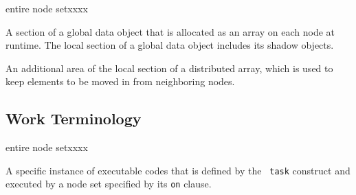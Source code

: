 \begin{namelist}{entire node setxxxx}

 A section of a global data object that is allocated as an array on each node
 at runtime.
%
 The local section of a global data object includes its shadow objects.


 An additional area of the local section of a distributed array, which
 is used to keep elements to be moved in from neighboring
 nodes.


\end{namelist}


\subsection{Work Terminology}

\begin{namelist}{entire node setxxxx}


 A specific instance of executable codes that is defined by the {\tt
 task} construct and executed by a node set specified by its {\tt on}
 clause.


%

%


\end{namelist}


